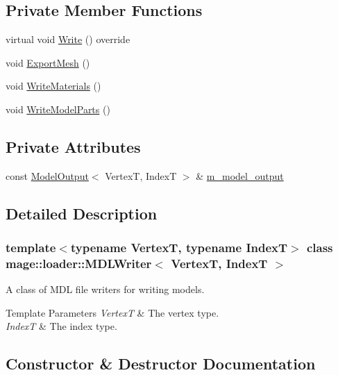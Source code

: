 \subsection*{Private Member Functions}
\begin{DoxyCompactItemize}
\item 
virtual void \hyperlink{classmage_1_1loader_1_1_m_d_l_writer_ac18c8e7d0e770e69a401d07cccd4616a}{Write} () override
\item 
void \hyperlink{classmage_1_1loader_1_1_m_d_l_writer_a1f84a800cc0b415894914b64e3cc82d4}{Export\+Mesh} ()
\item 
void \hyperlink{classmage_1_1loader_1_1_m_d_l_writer_a695190923a4bf8158f2eae1c945fd052}{Write\+Materials} ()
\item 
void \hyperlink{classmage_1_1loader_1_1_m_d_l_writer_aff9e417a04491202090105b93e7ee42c}{Write\+Model\+Parts} ()
\end{DoxyCompactItemize}
\subsection*{Private Attributes}
\begin{DoxyCompactItemize}
\item 
const \hyperlink{structmage_1_1_model_output}{Model\+Output}$<$ VertexT, IndexT $>$ \& \hyperlink{classmage_1_1loader_1_1_m_d_l_writer_a1849bbbc7a219f50bf167c12b1433995}{m\+\_\+model\+\_\+output}
\end{DoxyCompactItemize}


\subsection{Detailed Description}
\subsubsection*{template$<$typename VertexT, typename IndexT$>$\newline
class mage\+::loader\+::\+M\+D\+L\+Writer$<$ Vertex\+T, Index\+T $>$}

A class of M\+DL file writers for writing models.


\begin{DoxyTemplParams}{Template Parameters}
{\em VertexT} & The vertex type. \\
\hline
{\em IndexT} & The index type. \\
\hline
\end{DoxyTemplParams}


\subsection{Constructor \& Destructor Documentation}
\hypertarget{classmage_1_1loader_1_1_m_d_l_writer_a09d15b2ee7bedbbda744b9866c2392c6}{}\label{classmage_1_1loader_1_1_m_d_l_writer_a09d15b2ee7bedbbda744b9866c2392c6} 
